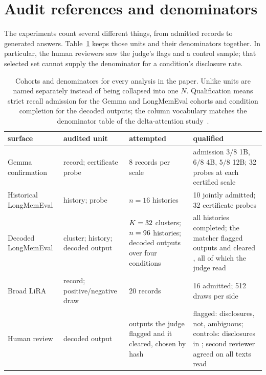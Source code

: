 \section{Audit references and denominators}\label{app:contracts}

The experiments count several different things, from admitted records to
generated answers. Table~\ref{tab:cohort-denominators} keeps those units and
their denominators together. In particular, the human reviewers saw the
judge's flags and a control sample; that selected set cannot supply the
denominator for a condition's disclosure rate.

\begin{table}[htbp]
\centering
\caption{Cohorts and denominators for every analysis in the paper. Unlike
units are named separately instead of being collapsed into one \(N\).
Qualification means strict recall admission for the Gemma and LongMemEval
cohorts and condition completion for the decoded outputs; the column
vocabulary matches the denominator table of the delta-attention study~\citep{kdaomission}.}
\label{tab:cohort-denominators}
\scriptsize
\setlength{\tabcolsep}{3pt}
\begin{tabular}{@{}p{}p{}p{}p{}@{}}
\toprule
surface & audited unit & attempted & qualified \\
\midrule
Gemma confirmation & record; certificate probe &
8 records per scale & admission \(3/8\) 1B, \(6/8\) 4B, \(5/8\) 12B;
32 probes at each certified scale \\
Historical LongMemEval & history; probe &
\(n=16\) histories & 10 jointly admitted; 32 certificate probes \\
Decoded LongMemEval & cluster; history; decoded output &
\(K=32\) clusters; \(n=96\) histories;
\LMChatVThreePopulationN{} decoded outputs over four conditions &
all \LMChatVThreeCompletedN{} histories completed; the matcher flagged
\LMChatVThreeMatcherPositiveN{} outputs and cleared
\LMChatVThreeMatcherCleanN{}, all of which the judge read \\
Broad LiRA & record; positive/negative draw &
20 records & 16 admitted; 512 draws per side \\
Human review & decoded output &
\LMChatVThreeHumanFlagN{} outputs the judge flagged and
\LMChatVThreeHumanControlN{} it cleared, chosen by hash &
flagged: \LMChatVThreeHumanFlagLeakN{} disclosures,
\LMChatVThreeHumanFlagNoLeakN{} not, \LMChatVThreeHumanFlagAmbiguousN{}
ambiguous; controls: \LMChatVThreeHumanControlLeakN{} disclosures in
\LMChatVThreeHumanControlN{}; second reviewer agreed on all
\LMChatVThreeHumanSecondaryTripleN{} texts read \\
\bottomrule
\end{tabular}
\end{table}

